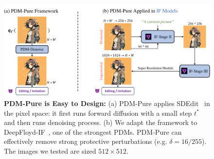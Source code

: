 \begin{figure}[t]
  \centering
\includegraphics[width=0.8\linewidth]{images/purifier.pdf}
  \vspace{-5pt}
  \caption{\textbf{PDM-Pure is Easy to Design:} (a) PDM-Pure applies SDEdit~\cite{meng2021sdedit} in the pixel space: it first runs forward diffusion with a small step $t^{*}$ and then runs denoising process. (b) We adapt the framework to DeepFloyd-IF~\cite{deepfloyd}, one of the strongest PDMs. PDM-Pure can effectively remove strong protective perturbations (e.g. $\delta=16/255$). The images we tested are sized $512\times 512$.}

\label{fig:purification_pipeline}
  \vspace{-0.5cm}
\end{figure}
